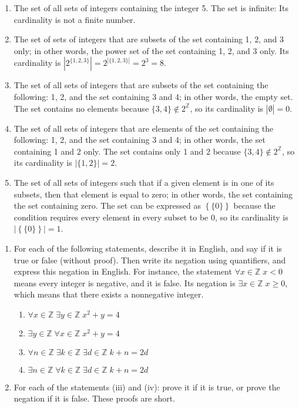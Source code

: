 \documentclass{article}
\newcommand{\Z}{\mathbb{Z}}
\theoremstyle{definition}
\begin{document}
\begin{solution}
\begin{enumerate}
    \item The set of all sets of integers containing the integer 5. The set is infinite: Its cardinality is not a finite number.
    \item The set of sets of integers that are subsets of the set containing 1, 2, and 3 only; in other words, the power set of the set containing 1, 2, and 3 only. Its cardinality is $\left|2^{\{1,2,3\}}\right|=2^{|\{1,2,3\}|}=2^3=8$.
    \item The set of all sets of integers that are subsets of the set containing the following: 1, 2, and the set containing 3 and 4; in other words, the empty set. The set contains no elements because $\{3,4\}\notin 2^\Z$, so its cardinality is $|\emptyset|=0$.
    \item The set of all sets of integers that are elements of the set containing the following: 1, 2, and the set containing 3 and 4; in other words, the set containing 1 and 2 only. The set contains only 1 and 2 because $\{3,4\}\notin 2^\Z$, so its cardinality is $|\{1,2\}|=2$.
    \item The set of all sets of integers such that if a given element is in one of its subsets, then that element is equal to zero; in other words, the set containing the set containing zero. The set can be expressed as $\left\{\{0\}\right\}$ because the condition requires every element in every subset to be 0, so its cardinality is $\left|\left\{\{0\}\right\}\right|=1$.
\end{enumerate}
\end{solution}
\begin{question}
\begin{enumerate}
    \item For each of the following statements, describe it in English, and say if it is true or false (without proof). Then write its negation using quantifiers, and express this negation in English. For instance, the statement $\forall x \in \Z \; x < 0$ means every integer is negative, and it is false. Its negation is $\exists x \in \Z \; x \geq 0$, which means that there exists a nonnegative integer.
	\begin{enumerate}
		\item $\forall x \in \Z \; \exists y \in \Z \; x^2 + y = 4$
		\item $\exists y \in \Z \; \forall x \in \Z \; x^2 + y = 4$
		\item $\forall n \in \Z \; \exists k \in \Z \; \exists d \in \Z \; k+ n = 2d$
		\item $\exists n \in \Z \; \forall k \in \Z \; \exists d \in \Z \; k+ n = 2d$
	\end{enumerate}
	\item For each of the statements (iii) and (iv): prove it if it is true, or prove the negation if it is false. These proofs are short.
\end{enumerate}
\end{question}
\end{document}
